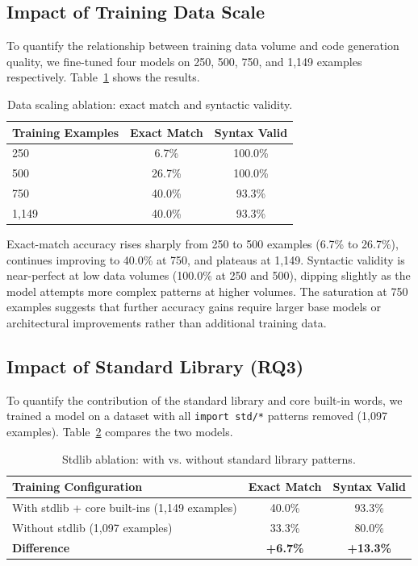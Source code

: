 \documentclass[11pt,a4paper]{article}
\begin{document}
\subsection{Impact of Training Data Scale}

To quantify the relationship between training data volume and code generation
quality, we fine-tuned four models on 250, 500, 750, and 1,149 examples
respectively. Table~\ref{tab:scaling} shows the results.

\begin{table}[ht]
\centering
\caption{Data scaling ablation: exact match and syntactic validity.}
\label{tab:scaling}
\begin{tabular}{lcc}
\toprule
\textbf{Training Examples} & \textbf{Exact Match} & \textbf{Syntax Valid} \\
\midrule
250  & 6.7\%  & 100.0\% \\
500  & 26.7\% & 100.0\% \\
750  & 40.0\% & 93.3\%  \\
1,149 & 40.0\% & 93.3\%  \\
\bottomrule
\end{tabular}
\end{table}

Exact-match accuracy rises sharply from 250 to 500 examples (6.7\% to
26.7\%), continues improving to 40.0\% at 750, and plateaus at 1,149.
Syntactic validity is near-perfect at low data volumes (100.0\% at 250
and 500), dipping slightly as the model attempts more complex patterns at
higher volumes. The saturation at 750 examples suggests that further
accuracy gains require larger base models or architectural improvements
rather than additional training data.

\subsection{Impact of Standard Library (RQ3)}

To quantify the contribution of the standard library and core built-in
words, we trained a model on a dataset with all \texttt{import std/*}
patterns removed (1,097 examples). Table~\ref{tab:stdlib} compares the
two models.

\begin{table}[ht]
\centering
\caption{Stdlib ablation: with vs. without standard library patterns.}
\label{tab:stdlib}
\begin{tabular}{lcc}
\toprule
\textbf{Training Configuration} & \textbf{Exact Match} & \textbf{Syntax Valid} \\
\midrule
With stdlib + core built-ins (1,149 examples) & 40.0\% & 93.3\%  \\
Without stdlib (1,097 examples)               & 33.3\% & 80.0\%  \\
\midrule
\textbf{Difference}                           & \textbf{+6.7\%} & \textbf{+13.3\%} \\
\bottomrule
\end{tabular}
\end{table}
\end{document}
